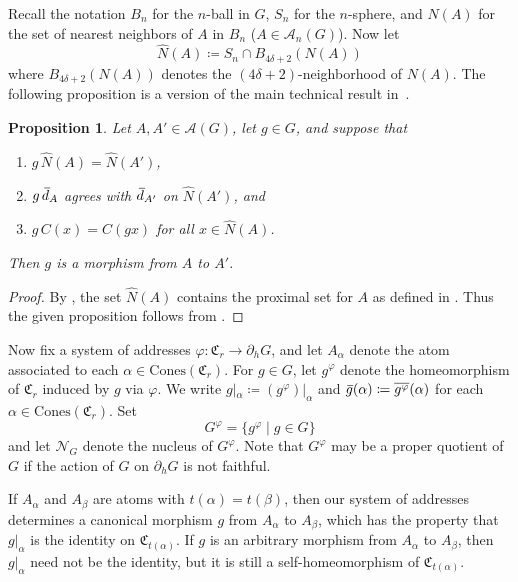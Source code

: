 \documentclass[11pt,letterpaper]{amsart}
\newtheorem{proposition}[theorem]{Proposition}
\theoremstyle{definition}
\newcommand{\Nuc}{\mathcal{N}}
\newcommand{\C}{\mathfrak{C}}
\newcommand{\A}{\mathcal{A}}
\newcommand{\Cones}{\mathrm{Cones}}
\newcommand{\od}{\mkern 3mu\overline{\mkern-3mu d\mkern 1.5mu}\mkern-1.5mu}
\newcommand{\og}{\mkern 2mu\overline{\mkern-2mu g\mkern0.5mu}\mkern-0.5mu}
\begin{document}
Recall the notation $B_n$ for the $n$-ball in $G$, $S_n$ for the $n$-sphere, and $N(A)$ for the set of nearest neighbors of $A$ in $B_n$ ($A\in \A_n(G)$). Now let
\[
\widehat{N}(A) \coloneqq S_n \cap B_{4\delta+2}(N(A))
\]
where $B_{4\delta+2}(N(A))$ denotes the $(4\delta+2)$-neighborhood of $N(A)$. The following proposition is a version of the main technical result in~\cite{BelkBleakMatucci}.

\begin{proposition}\label{prop:MakeMorphisms}
Let $A,A'\in\A(G)$, let $g\in G$, and suppose that
\begin{enumerate}
    \item $g\,\widehat{N}(A)=\widehat{N}(A')$,\smallskip
    \item $g\,\od_A$ agrees with $\od_{A'}$ on $\widehat{N}(A')$, and\smallskip
    \item $g\,C(x) = C(gx)$ for all $x\in \widehat{N}(A)$.
\end{enumerate}
Then $g$ is a morphism from $A$ to $A'$.
\end{proposition}
\begin{proof}
By \cite[Proposition~3.21]{BelkBleakMatucci}, the set $\widehat{N}(A)$ contains the proximal set for $A$ as defined in \cite[Definition~3.20]{BelkBleakMatucci}.  Thus the given proposition follows from \cite[Proposition~3.27]{BelkBleakMatucci}.
\end{proof}

Now fix a system of addresses $\varphi\colon \C_r\to \partial_h G$, and let $A_\alpha$ denote the atom associated to each $\alpha\in\Cones(\C_r)$.  For $g\in G$, let $g^\varphi$ denote the homeomorphism of $\C_r$ induced by $g$ via $\varphi$.  We write $g|_\alpha\coloneqq (g^\varphi)|_\alpha$ and $\og(\alpha)\coloneqq \overline{g^\varphi}(\alpha)$ for each $\alpha\in \Cones(\C_r)$. Set
\[
G^\varphi = \bigl\{g^\varphi \;\bigr|\; g\in G\bigr\}
\]
and let $\Nuc_G$ denote the nucleus of $G^\varphi$.  Note that $G^\varphi$ may be a proper quotient of~$G$ if the action of $G$ on $\partial_h G$ is not faithful. 

If $A_\alpha$ and $A_\beta$ are atoms with $t(\alpha)= t(\beta)$, then our system of addresses determines a canonical morphism $g$ from $A_\alpha$ to $A_\beta$, which has the property that $g|_\alpha$ is the identity on $\C_{t(\alpha)}$.  If $g$ is an arbitrary morphism from $A_\alpha$ to $A_\beta$, then $g|_{\alpha}$ need not be the identity, but it is still a self-homeomorphism of $\C_{t(\alpha)}$.
\end{document}
